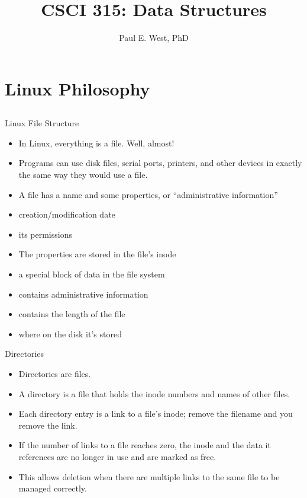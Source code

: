 \documentclass{beamer}
\title{CSCI 315: Data Structures}
\author{Paul E. West, PhD}
\institute{
  Department of Computer Science\\
  Charleston Southern University
}
\begin{document}
\begin{frame}
  \titlepage
\end{frame}

\section{Linux Philosophy}
\subsection{}
\begin{frame}{Linux File Structure}
\begin{itemize}
\item In Linux, everything is a file. Well, almost!
\item Programs can use disk files, serial ports, printers, and other devices in exactly the same way they would use a file.
\item A file has a name and some properties, or ``administrative information''
\item creation/modification date 
\item its permissions
\item The properties are stored in the file's inode
\item a special block of data in the file system
\item contains administrative information
\item contains the length of the file
\item where on the disk it's stored
\end{itemize}
\end{frame}

\begin{frame}{Directories}
\begin{itemize}
\item Directories are files.
\item A directory is a file that holds the inode numbers and names of other files.
\item Each directory entry is a link to a file's inode; remove the filename and you remove the link.
\item If the number of links to a file reaches zero, the inode and the data it references are no longer in use and are marked as free.
\item This allows deletion when there are multiple links to the same file to be managed correctly.
\end{itemize}
\end{frame}
\end{document}
